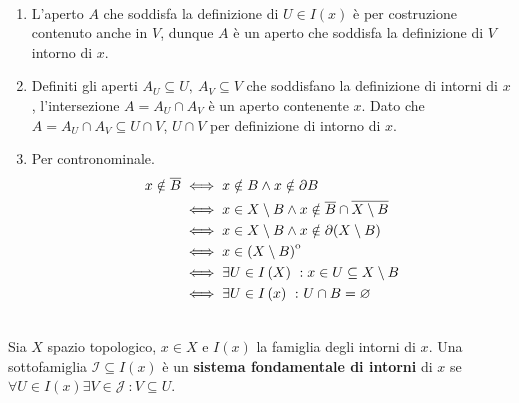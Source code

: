 \begin{demonstration}~{}
\begin{enumerate}[label=\Roman*]
\item L'aperto $A$ che soddisfa la definizione di $U\in I\left(x\right)$ è per costruzione contenuto anche in $V$, dunque $A$ è un aperto che soddisfa la definizione di $V$ intorno di $x$.
\item Definiti gli aperti $A_U\subseteq U,\ A_V\subseteq V$ che soddisfano la definizione di intorni di $x$, l'intersezione $A=A_U\cap A_V$ è un aperto contenente $x$. Dato che $A=A_U\cap A_V\subseteq U\cap V$, $U\cap V$ per definizione di intorno di $x$.
\item Per contronominale. \begin{align*}
	x\notin \overline{B} &\iff x\notin B \wedge x\notin \partial B\\
	&\iff x\in X\setminus B \wedge x\notin \overline{B}\cap\overline{X\setminus B}\\
	& \iff x\in X\setminus B \wedge x\notin \partial (X\setminus B)\\
	& \iff x\in {\kern0pt\left(X\setminus B\right)}^{\mathrm{o}}\\
	& \iff \exists U\in I\left(X\right)\ : x\in U\subseteq X\setminus B\\
	&\iff \exists U\in I\left(x\right)\ \colon U\cap B=\varnothing
\end{align*} 
\end{enumerate}
\vspace{-6mm}
\end{demonstration}
\begin{define}~{}\\
Sia $X$ spazio topologico, $x\in X$ e $I\left(x\right)$ la famiglia degli intorni di $x$. Una sottofamiglia $\mathcal{I}\subseteq I\left(x\right)$ è un \textbf{sistema fondamentale di intorni} di $x$ se $\forall U\in I\left(x\right)\exists V\in\mathcal{J}\ \colon V\subseteq U$.
\end{define}
